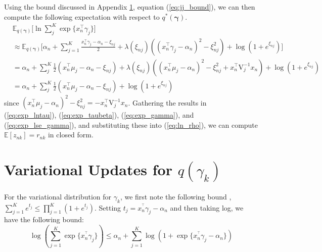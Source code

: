 \documentclass[twoside,11pt]{article}
\newcommand{\tr}{\intercal}
\newcommand{\E}{\mathbb{E}}
\begin{document}
Using the bound discussed in Appendix \ref{app:gamma}, equation (\ref{eq:jj_bound}), we can then compute the following expectation with respect to $q^{*}(\boldsymbol\gamma)$.
\begin{equation} \label{eq:exp_lse_gamma}
\begin{split}
	& \E_{q(\boldsymbol\gamma)} \Bigg[ \ln \sum_{j}^K \exp \{ x_n^{\tr} \gamma_j \} \Bigg] \\
	& \approx \E_{q(\boldsymbol\gamma)} \Bigg[ \alpha_n + \sum_{j = 1}^K \frac{x_n^{\intercal} \gamma_j - \alpha_n - \xi_{nj}}{2} + \lambda(\xi_{nj}) \left( (x_n^{\intercal} \gamma_j - \alpha_n)^2 - \xi_{nj}^2\right) + \log \left( 1 + e^{\xi_{nj}}\right) \Bigg] \\
	& = \alpha_n + \sum_{j}^K \frac{1}{2}\left(x_n^{\tr}\mu_j - \alpha_n - \xi_{nj}\right) + \lambda(\xi_{nj}) \left( (x_n^{\tr} \mu_j - \alpha_n)^2 - \xi_{nj}^2 + x_n^{\tr} \mathrm{V}_j^{-1} x_n \right) + \log( 1 + e^{\xi_{nj}}) \\
	&= \alpha_n + \sum_{j}^K \frac{1}{2}\left(x_n^{\tr}\mu_j - \alpha_n - \xi_{nj}\right) + \log( 1 + e^{\xi_{nj}})
\end{split}
\end{equation}
since $(x_n^{\tr} \mu_j - \alpha_n)^2 - \xi_{nj}^2 = - x_n^{\tr} \mathrm{V}_j^{-1} x_n$. Gathering the results in (\ref{eq:exp_lntau}), (\ref{eq:exp_taubeta}), (\ref{eq:exp_gamma}), and (\ref{eq:exp_lse_gamma}), and substituting these into (\ref{eq:ln_rho}), we can compute $\E[z_{nk}] = r_{nk}$ in closed form. 



\section{Variational Updates for $q(\gamma_k)$} \label{app:gamma}  



For the variational distribution for $\gamma_k$, we first note the following bound \parencite{bouchard:07}, $\sum_{j = 1}^{K} e^{t_j} \leq \prod_{j = 1}^K (1 + e^{t_j})$. Setting $t_j = x_n^{^\intercal} \gamma_j - \alpha_{n}$ and then taking log, we have the following bound:
\begin{equation} \label{eq:log-sum-exp}
	\log \left( \sum_{j = 1}^K \exp\{ x_n^{^\intercal} \gamma_j \}\right) \leq \alpha_n + \sum_{j=1}^K \log \left( 1 + \exp \{ x_n^{^\intercal} \gamma_j - \alpha_n \}\right)
\end{equation}
\end{document}
